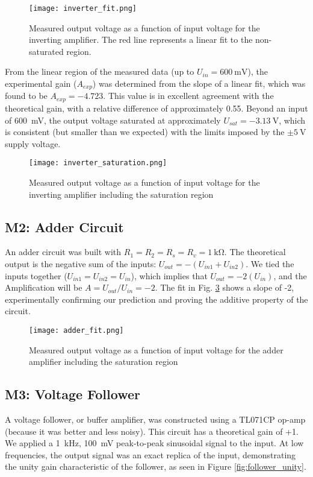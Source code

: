 \documentclass[12pt,a4paper]{article}
\begin{document}
\begin{figure}[H]
    \centering
    \texttt{[image: inverter\_fit.png]} %
    \caption{Measured output voltage as a function of input voltage for the inverting amplifier. The red line represents a linear fit to the non-saturated region.}
    \label{fig:inverting_amp_gain}
\end{figure}

From the linear region of the measured data (up to \(U_{in} = \SI{600}{\milli\volt}\)), the experimental gain (\(A_{exp}\)) was determined from the slope of a linear fit, which was found to be \(A_{exp} = -4.723\). This value is in excellent agreement with the theoretical gain, with a relative difference of approximately 0.55. Beyond an input of \SI{600}{\milli\volt}, the output voltage saturated at approximately \(U_{sat} = \SI{-3.13}{\volt}\), which is consistent (but smaller than we expected) with the limits imposed by the \(\pm\SI{5}{\volt}\) supply voltage.

\begin{figure}[H]
    \centering
    \texttt{[image: inverter\_saturation.png]} %
    \caption{Measured output voltage as a function of input voltage for the inverting amplifier including the saturation region}
    \label{fig:inverting_amp_saturated}
\end{figure}

\subsection{M2: Adder Circuit}
An adder circuit was built with \(R_1 = R_2 = R_s = R_v = \SI{1}{\kilo\ohm}\). The theoretical output is the negative sum of the inputs: \(U_{out} = -(U_{in1} + U_{in2})\). We tied the inputs together (\(U_{in1} = U_{in2} = U_{in}\)), which implies that \(U_{out} = -2(U_{in})\), and the Amplification will be \(A = U_{out}/U_{in} = -2\). The fit in Fig. \ref{fig:adder} shows a slope of -2, experimentally confirming our prediction and proving the additive property of the circuit.

\begin{figure}[H]
    \centering
    \texttt{[image: adder\_fit.png]} %
    \caption{Measured output voltage as a function of input voltage for the adder amplifier including the saturation region}
    \label{fig:adder}
\end{figure}

\subsection{M3: Voltage Follower}
A voltage follower, or buffer amplifier, was constructed using a TL071CP op-amp (because it was better and less noisy). This circuit has a theoretical gain of +1. We applied a \SI{1}{\kilo\hertz}, \SI{100}{\milli\volt} peak-to-peak sinusoidal signal to the input. At low frequencies, the output signal was an exact replica of the input, demonstrating the unity gain characteristic of the follower, as seen in Figure \ref{fig:follower_unity}.
\end{document}
